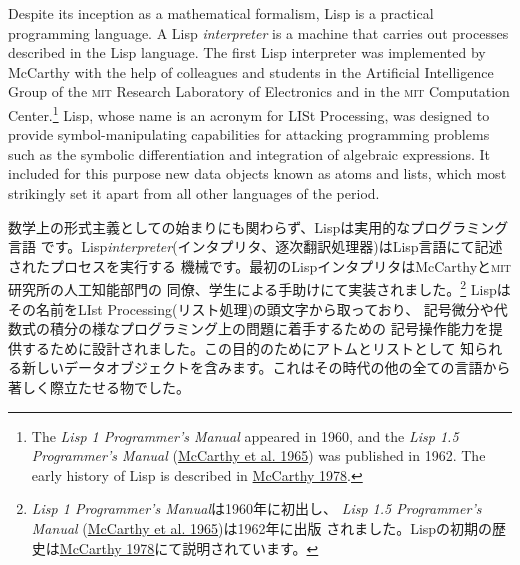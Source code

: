 \documentclass[oneside]{book}
\newcommand{\acronym}[1]{\textsc{\MakeLowercase{#1}}}
\newcommand{\newterm}[1]{\index{#1}\emph{#1}}
\newcommand{\link}[1]{\hyperref[#1]{#1}}
\begin{document}
Despite its inception as a mathematical formalism, Lisp is a practical
programming language.  A Lisp \newterm{interpreter} is a machine that carries
out processes described in the Lisp language.  The first Lisp interpreter was
implemented by McCarthy with the help of colleagues and students in the
Artificial Intelligence Group of the \acronym{MIT} Research Laboratory of
Electronics and in the \acronym{MIT} Computation Center.\footnote{The
\textit{Lisp 1 Programmer's Manual} appeared in 1960, and the \textit{Lisp 1.5
Programmer's Manual} (\link{McCarthy et al. 1965}) was published in 1962.  The early history
of Lisp is described in \link{McCarthy 1978}.}  Lisp, whose name is an acronym for
LISt Processing, was designed to provide symbol-manipulating capabilities for
attacking programming problems such as the symbolic differentiation and
integration of algebraic expressions.  It included for this purpose new data
objects known as atoms and lists, which most strikingly set it apart from all
other languages of the period.

数学上の形式主義としての始まりにも関わらず、Lispは実用的なプログラミング言語
です。Lisp\newterm{interpreter}(インタプリタ、逐次翻訳処理器)はLisp言語にて記述されたプロセスを実行する
機械です。最初のLispインタプリタはMcCarthyと\acronym{MIT}研究所の人工知能部門の
同僚、学生による手助けにて実装されました。\footnote{
\textit{Lisp 1 Programmer's Manual}は1960年に初出し、
\textit{Lisp 1.5 Programmer's Manual} (\link{McCarthy et al. 1965})は1962年に出版
されました。Lispの初期の歴史は\link{McCarthy 1978}にて説明されています。}
Lispはその名前をLIst Processing(リスト処理)の頭文字から取っており、
記号微分や代数式の積分の様なプログラミング上の問題に着手するための
記号操作能力を提供するために設計されました。この目的のためにアトムとリストとして
知られる新しいデータオブジェクトを含みます。これはその時代の他の全ての言語から
著しく際立たせる物でした。
\end{document}
